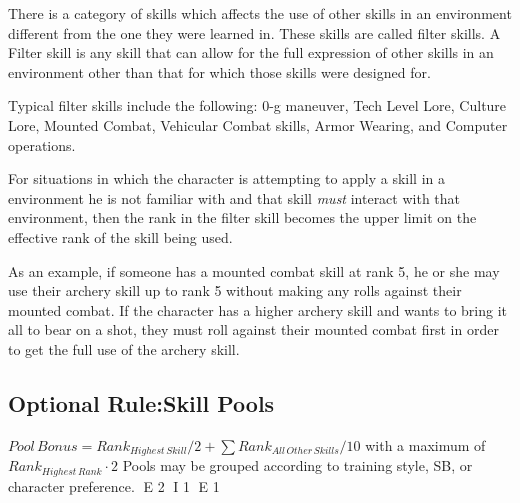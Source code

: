 There is a category of skills which affects the use of other skills 
in an environment different from the one they were learned in. These skills 
are called filter skills. A Filter skill is any skill that can allow
for the full expression of other skills in an environment other than 
that for which those skills were designed for.

Typical filter skills include the following: 0-g maneuver, Tech 
Level Lore, Culture Lore, Mounted Combat, Vehicular Combat 
skills, Armor Wearing, and Computer operations.

For situations in which the character is attempting to apply a skill 
in a environment he is not familiar with and that skill {\em must }
interact with that environment, then the rank in the filter skill 
becomes the upper limit on the effective rank of the skill being 
used.

As an example, if someone has a mounted combat skill at rank 5, he or she
may use their archery skill up to rank 5 without making any rolls
against their mounted combat. If the character has a higher archery skill
and wants to bring it all to bear on a shot, they must roll against
their mounted combat first in order to get the full use of the archery
skill.

\subsection{Optional Rule:Skill Pools}

$ {Pool\, Bonus} = Rank_{Highest\, Skill}/2 + \sum {Rank_{All\, Other\, Skills}}/10$ with a maximum
of $ Rank_{Highest\, Rank} \cdot 2$
Pools may be grouped according to training style, SB, or character
preference. 
E 2
I 1
E 1
